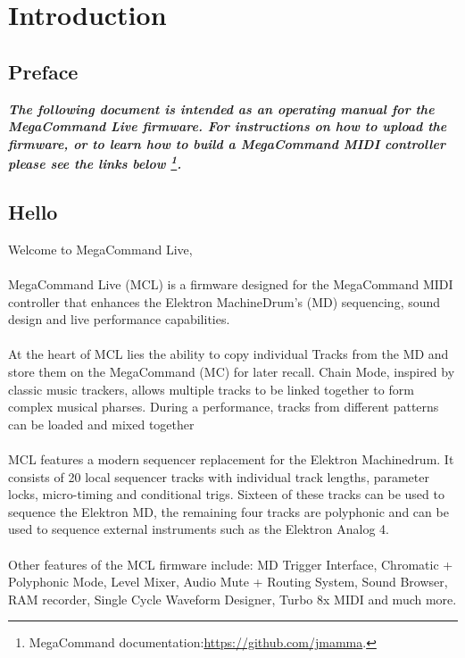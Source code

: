 \chapter{Introduction}

\section{Preface}

\begin{small}
\textbf{\textit{The following document is intended as an operating manual for the MegaCommand Live firmware. For instructions on how to upload the firmware, or to learn how to build a MegaCommand MIDI controller please see the links below \footnote{MegaCommand documentation:\url{https://github.com/jmamma}.}.}}
\end{small}

\section{Hello}
Welcome to MegaCommand Live, 
\\
\\
MegaCommand Live (MCL) is a firmware designed for the MegaCommand MIDI controller that enhances the Elektron MachineDrum's (MD) sequencing, sound design and live performance capabilities.
\\
\\
At the heart of MCL lies the ability to copy individual Tracks from the MD and store them on the MegaCommand (MC) for later recall. Chain Mode, inspired by classic music trackers, allows multiple tracks to be linked together to form complex musical pharses. During a performance, tracks from different patterns can be loaded and mixed together
\\
\\
MCL features a modern sequencer replacement for the Elektron Machinedrum. It consists of 20 local sequencer tracks with individual track lengths, parameter locks, micro-timing and conditional trigs. Sixteen of these tracks can be used to sequence the Elektron MD, the remaining four tracks are polyphonic and can be used to sequence external instruments such as the Elektron Analog 4. 
\\
\\
Other features of the MCL firmware include: MD Trigger Interface, Chromatic + Polyphonic Mode,  Level Mixer, Audio Mute + Routing System, Sound Browser, RAM recorder, Single Cycle Waveform Designer, Turbo 8x MIDI and much more.

